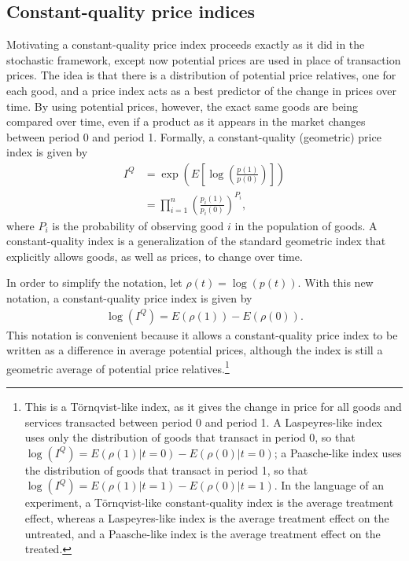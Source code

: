 \documentclass[
]{article}
\begin{document}
\hypertarget{constant-quality-price-indices}{%
\subsection{Constant-quality price indices}\label{constant-quality-price-indices}}

Motivating a constant-quality price index proceeds exactly as it did in the stochastic framework, except now potential prices are used in place of transaction prices. The idea is that there is a distribution of potential price relatives, one for each good, and a price index acts as a best predictor of the change in prices over time. By using potential prices, however, the exact same goods are being compared over time, even if a product as it appears in the market changes between period 0 and period 1. Formally, a constant-quality (geometric) price index is given by
\begin{align*}
I^{Q} &= \exp\left(E\left[\log\left(\frac{p(1)}{p(0)}\right)\right]\right) \\
&= \prod_{i = 1}^{n} \left(\frac{p_{i}(1)}{p_{i}(0)}\right)^{P_{i}},
\end{align*}
where \(P_{i}\) is the probability of observing good \(i\) in the population of goods. A constant-quality index is a generalization of the standard geometric index that explicitly allows goods, as well as prices, to change over time.

In order to simplify the notation, let \(\rho(t) = \log(p(t))\). With this new notation, a constant-quality price index is given by
\begin{align*}
\log(I^{Q}) = E(\rho(1)) - E(\rho(0)).
\end{align*}
This notation is convenient because it allows a constant-quality price index to be written as a difference in average potential prices, although the index is still a geometric average of potential price relatives.\footnote{This is a Törnqvist-like index, as it gives the change in price for all goods and services transacted between period 0 and period 1. A Laspeyres-like index uses only the distribution of goods that transact in period 0, so that \(\log(I^{Q}) = E(\rho(1) | t = 0) - E(\rho(0) | t = 0)\); a Paasche-like index uses the distribution of goods that transact in period 1, so that \(\log(I^{Q}) = E(\rho(1) | t = 1) - E(\rho(0) | t = 1)\). In the language of an experiment, a Törnqvist-like constant-quality index is the average treatment effect, whereas a Laspeyres-like index is the average treatment effect on the untreated, and a Paasche-like index is the average treatment effect on the treated.}
\end{document}
